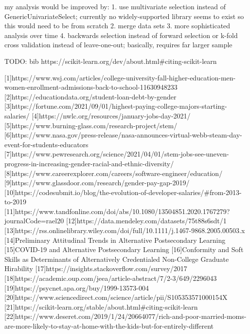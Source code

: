 \documentclass[review]{elsarticle}
\begin{document}
my analysis would be improved by:
  1. use multivariate selection instead of GenericUnivariateSelect; currently no widely-supported library seems to exist so this would need to be from scratch
  2. merge data sets
  3. more sophisticated analysis over time
  4. backwards selection instead of forward selection or k-fold cross validation instead of leave-one-out; basically, requires far larger sample




TODO: bib https://scikit-learn.org/dev/about.html#citing-scikit-learn

[1]https://www.wsj.com/articles/college-university-fall-higher-education-men-women-enrollment-admissions-back-to-school-11630948233
[2]https://educationdata.org/student-loan-debt-by-gender
[3]https://fortune.com/2021/09/01/highest-paying-college-majors-starting-salaries/
[4]https://nwlc.org/resources/january-jobs-day-2021/
[5]https://www.burning-glass.com/research-project/stem/
[6]https://www.nasa.gov/press-release/nasa-announces-virtual-webb-steam-day-event-for-students-educators
[7]https://www.pewresearch.org/science/2021/04/01/stem-jobs-see-uneven-progress-in-increasing-gender-racial-and-ethnic-diversity/
[8]https://www.careerexplorer.com/careers/software-engineer/education/
[9]https://www.glassdoor.com/research/gender-pay-gap-2019/
[10]https://codesubmit.io/blog/the-evolution-of-developer-salaries/#from-2013-to-2019
[11]https://www.tandfonline.com/doi/abs/10.1080/13504851.2020.1767279?journalCode=rael20
[12]https://data.mendeley.com/datasets/75t88s6sdt/1
[13]https://rss.onlinelibrary.wiley.com/doi/full/10.1111/j.1467-9868.2005.00503.x
[14]Preliminary Attitudinal Trends in Alternative Postsecondary Learning
[15]COVID-19 and Alternative Postsecondary Learning
[16]Conformity and Soft Skills as Determinants of Alternatively Credentialed Non-College Graduate Hirability
[17]https://insights.stackoverflow.com/survey/2017
[18]https://academic.oup.com/jeea/article-abstract/7/2-3/649/2296043
[19]https://psycnet.apa.org/buy/1999-13573-004
[20]https://www.sciencedirect.com/science/article/pii/S105353571000154X
[21]https://scikit-learn.org/stable/about.html#citing-scikit-learn
[22]https://www.deseret.com/2019/1/24/20664077/rich-and-poor-married-moms-are-more-likely-to-stay-at-home-with-the-kids-but-for-entirely-different
\end{document}
